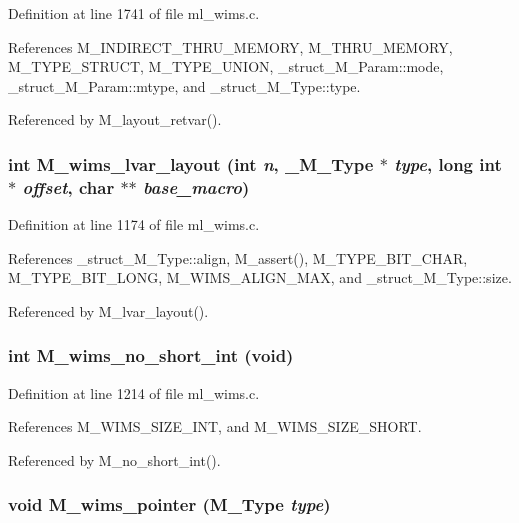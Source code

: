 Definition at line 1741 of file ml\_\-wims.c.

References M\_\-INDIRECT\_\-THRU\_\-MEMORY, M\_\-THRU\_\-MEMORY, M\_\-TYPE\_\-STRUCT, M\_\-TYPE\_\-UNION, \_\-struct\_\-M\_\-Param::mode, \_\-struct\_\-M\_\-Param::mtype, and \_\-struct\_\-M\_\-Type::type.

Referenced by M\_\-layout\_\-retvar().
\subsubsection{\setlength{\rightskip}{0pt plus 5cm}int M\_\-wims\_\-lvar\_\-layout (int {\em n}, \bf{\_\-M\_\-Type} $\ast$ {\em type}, long int $\ast$ {\em offset}, char $\ast$$\ast$ {\em base\_\-macro})}\label{ml__wims_8c_d4929aae2a0828b6dedeb6e73afef9f3}




Definition at line 1174 of file ml\_\-wims.c.

References \_\-struct\_\-M\_\-Type::align, M\_\-assert(), M\_\-TYPE\_\-BIT\_\-CHAR, M\_\-TYPE\_\-BIT\_\-LONG, M\_\-WIMS\_\-ALIGN\_\-MAX, and \_\-struct\_\-M\_\-Type::size.

Referenced by M\_\-lvar\_\-layout().
\subsubsection{\setlength{\rightskip}{0pt plus 5cm}int M\_\-wims\_\-no\_\-short\_\-int (void)}\label{ml__wims_8c_971fbe33a88a0e70f29f09afaf1a126b}




Definition at line 1214 of file ml\_\-wims.c.

References M\_\-WIMS\_\-SIZE\_\-INT, and M\_\-WIMS\_\-SIZE\_\-SHORT.

Referenced by M\_\-no\_\-short\_\-int().
\subsubsection{\setlength{\rightskip}{0pt plus 5cm}void M\_\-wims\_\-pointer (\bf{M\_\-Type} {\em type})}\label{ml__wims_8c_e822751278a8ec6be431bebf9ee6721d}




